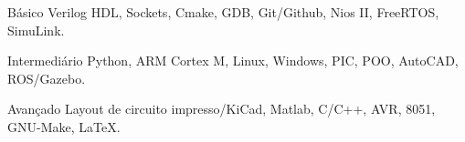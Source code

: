 

\begin{cvskills}

  \cvskill
    {Básico} %
    {Verilog HDL, Sockets, Cmake, GDB, Git/Github, Nios II, FreeRTOS, SimuLink.} %

  \cvskill
    {Intermediário} %
    {Python, ARM Cortex M, Linux, Windows, PIC, POO, AutoCAD, ROS/Gazebo.} %

  \cvskill
    {Avançado} %
    {Layout de circuito impresso/KiCad, Matlab, C/C++, AVR, 8051, GNU-Make, LaTeX.} %

\end{cvskills}




